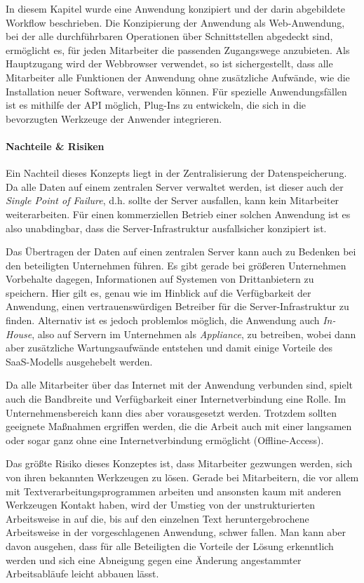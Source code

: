 In diesem Kapitel wurde eine Anwendung konzipiert und der darin abgebildete Workflow beschrieben. Die Konzipierung der Anwendung als Web-Anwendung, bei der alle durchführbaren Operationen über Schnittstellen abgedeckt sind, ermöglicht es, für jeden Mitarbeiter die passenden Zugangswege anzubieten. Als Hauptzugang wird der Webbrowser verwendet, so ist sichergestellt, dass alle Mitarbeiter alle Funktionen der Anwendung ohne zusätzliche Aufwände, wie die Installation neuer Software, verwenden können. Für spezielle Anwendungsfällen ist es mithilfe der API möglich, Plug-Ins zu entwickeln, die sich in die bevorzugten Werkzeuge der Anwender integrieren.

\paragraph{Nachteile \& Risiken} Ein Nachteil dieses Konzepts liegt in der Zentralisierung der Datenspeicherung. Da alle Daten auf einem zentralen Server verwaltet werden, ist dieser auch der \emph{Single Point of Failure}, d.h. sollte der Server ausfallen, kann kein Mitarbeiter weiterarbeiten. Für einen kommerziellen Betrieb einer solchen Anwendung ist es also unabdingbar, dass die Server-Infrastruktur ausfallsicher konzipiert ist. 

Das Übertragen der Daten auf einen zentralen Server kann auch zu Bedenken bei den beteiligten Unternehmen führen. Es gibt gerade bei größeren Unternehmen Vorbehalte dagegen, Informationen auf Systemen von Drittanbietern zu speichern. Hier gilt es, genau wie im Hinblick auf die Verfügbarkeit der Anwendung, einen vertrauenswürdigen Betreiber für die Server-Infrastruktur zu finden. Alternativ ist es jedoch problemlos möglich, die Anwendung auch \emph{In-House}, also auf Servern im Unternehmen als \emph{Appliance}, zu betreiben, wobei dann aber zusätzliche Wartungsaufwände entstehen und damit einige Vorteile des SaaS-Modells ausgehebelt werden. 

Da alle Mitarbeiter über das Internet mit der Anwendung verbunden sind, spielt auch die Bandbreite und Verfügbarkeit einer Internetverbindung eine Rolle. Im Unternehmensbereich kann dies aber vorausgesetzt werden. Trotzdem sollten geeignete Maßnahmen ergriffen werden, die die Arbeit auch mit einer langsamen oder sogar ganz ohne eine Internetverbindung ermöglicht (Offline-Access).

Das größte Risiko dieses Konzeptes ist, dass Mitarbeiter gezwungen werden, sich von ihren bekannten Werkzeugen zu lösen. Gerade bei Mitarbeitern, die vor allem mit Textverarbeitungsprogrammen arbeiten und ansonsten kaum mit anderen Werkzeugen Kontakt haben, wird der Umstieg von der unstrukturierten Arbeitsweise in  auf die, bis auf den einzelnen Text heruntergebrochene Arbeitsweise in der vorgeschlagenen Anwendung, schwer fallen. Man kann aber davon ausgehen, dass für alle Beteiligten die Vorteile der Lösung erkenntlich werden und sich eine Abneigung gegen eine Änderung angestammter Arbeitsabläufe leicht abbauen lässt.

